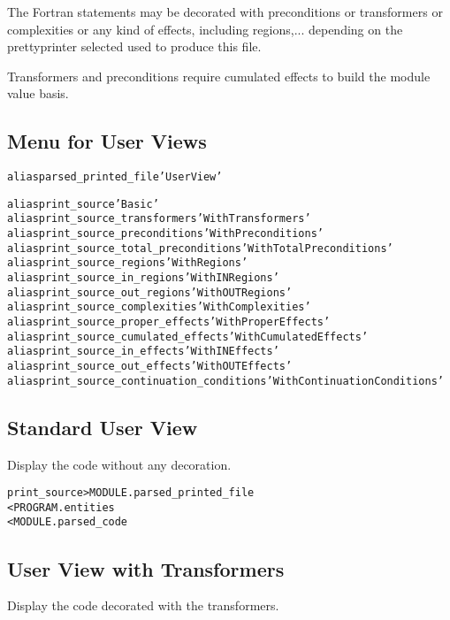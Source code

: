 \documentclass[a4paper]{report}
\newenvironment{PipsMake}{\begin{alltt}}{\end{alltt}}
\begin{document}
The Fortran statements may be
decorated with preconditions or transformers or complexities or any kind
of effects, including regions,... depending on the
prettyprinter selected used to produce this file.

Transformers and preconditions require cumulated effects to build the
module value basis.

\subsection{Menu for User Views}

\begin{PipsMake}
alias parsed_printed_file 'User View'

alias print_source 'Basic'
alias print_source_transformers 'With Transformers'
alias print_source_preconditions 'With Preconditions'
alias print_source_total_preconditions 'With Total Preconditions'
alias print_source_regions 'With Regions'
alias print_source_in_regions 'With IN Regions'
alias print_source_out_regions 'With OUT Regions'
alias print_source_complexities 'With Complexities'
alias print_source_proper_effects 'With Proper Effects'
alias print_source_cumulated_effects 'With Cumulated Effects'
alias print_source_in_effects 'With IN Effects'
alias print_source_out_effects 'With OUT Effects'
alias print_source_continuation_conditions 'With Continuation Conditions'
\end{PipsMake}

\subsection{Standard User View}

Display the code without any decoration.

\begin{PipsMake}
print_source         > MODULE.parsed_printed_file
        < PROGRAM.entities
        < MODULE.parsed_code
\end{PipsMake}

\subsection{User View with Transformers}

Display the code decorated with the transformers.
\end{document}
